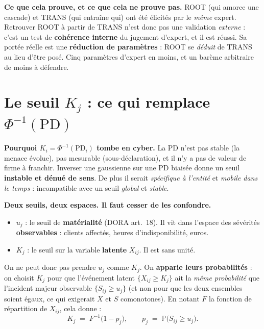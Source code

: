 \documentclass[11pt,a4paper]{article}
\begin{document}
\begin{attention}
\textbf{Ce que cela prouve, et ce que cela ne prouve pas.} ROOT (\og{}qui amorce une
cascade\fg{}) et TRANS (\og{}qui entraîne qui\fg{}) ont été élicités par le \emph{même} expert.
Retrouver ROOT à partir de TRANS n'est donc pas une validation \emph{externe} : c'est un
test de \textbf{cohérence interne} du jugement d'expert, et il est réussi. Sa portée réelle
est une \textbf{réduction de paramètres} : ROOT se \emph{déduit} de TRANS au lieu d'être
posé. Cinq paramètres d'expert en moins, et un barème arbitraire de moins à défendre.
\end{attention}

\section{Le seuil $K_j$ : ce qui remplace $\Phi^{-1}(\mathrm{PD})$}

\begin{attention}
\textbf{Pourquoi $K_i=\Phi^{-1}(\mathrm{PD}_i)$ tombe en cyber.} La PD n'est pas stable
(la menace évolue), pas mesurable (sous-déclaration), et il n'y a pas de \og{}valeur de firme\fg{}
à franchir. Inverser une gaussienne sur une PD biaisée donne un seuil \textbf{instable et
dénué de sens}. De plus il serait \emph{spécifique à l'entité} et \emph{mobile dans le temps} :
incompatible avec un seuil \emph{global} et \emph{stable}.
\end{attention}

\begin{cle}
\textbf{Deux seuils, deux espaces. Il faut cesser de les confondre.}
\begin{itemize}[leftmargin=1.4em,itemsep=2pt,topsep=2pt]
\item $u_j$ : le seuil de \textbf{matérialité} (DORA art.~18). Il vit dans l'espace des
  sévérités \textbf{observables} : clients affectés, heures d'indisponibilité, euros.
\item $K_j$ : le seuil sur la variable \textbf{latente} $X_{ij}$. Il est sans unité.
\end{itemize}
On ne peut donc pas \og{}prendre $u_j$ comme $K_j$\fg{}. On \textbf{apparie leurs probabilités} :
on choisit $K_j$ pour que l'événement latent $\{X_{ij}\ge K_j\}$ ait la \emph{même probabilité}
que l'incident majeur observable $\{S_{ij}\ge u_j\}$ (et non pour que les deux ensembles soient
égaux, ce qui exigerait $X$ et $S$ comonotones). En notant $F$ la fonction de répartition de
$X_{ij}$, cela donne :
\begin{equation}
\label{eq:Kj}
\boxed{\;K_j \;=\; F^{-1}\!\big(1 - p_j\big), \qquad p_j \;=\; \mathbb P\big(S_{ij} \ge u_j\big).\;}
\end{equation}
\end{cle}
\end{document}
